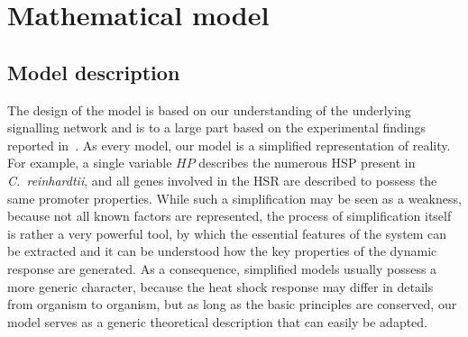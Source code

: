\documentclass[oneside, 10pt, a4paper, twocolumn]{article}
\begin{document}



\section{Mathematical model}
\label{SectionModel0}

\subsection{Model description}
\label{SectionModel}


The design of the model is based on our understanding of the underlying signalling network
and is to a large part based on the experimental findings reported in~\cite{Schmollinger2013}.
As every model, our model is a simplified representation of reality. For example, 
a single variable $HP$ describes the numerous HSP present in \textit{C.~reinhardtii},
and all genes involved in the HSR are described to possess the same promoter properties.
While such a simplification may be seen as a weakness, because not all known factors are represented,
the process of simplification itself is rather a very powerful tool, by which
the essential features of the system can be extracted and it can be understood
how the key properties of the dynamic response are generated.
As a consequence, simplified models usually possess a more generic character, because
the heat shock response may differ in details from organism to organism, but as long as
the basic principles are conserved, our model serves as a generic theoretical description that can easily be adapted.
\end{document}
